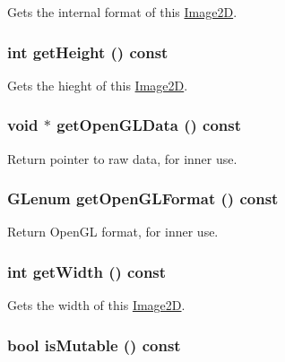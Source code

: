 Gets the internal format of this \hyperlink{classm3g_1_1Image2D}{Image2D}. \hypertarget{classm3g_1_1Image2D_317329daf960a1759801c0f16d43d5a3}{
\subsubsection[{getHeight}]{\setlength{\rightskip}{0pt plus 5cm}int getHeight () const}}
\label{classm3g_1_1Image2D_317329daf960a1759801c0f16d43d5a3}


Gets the hieght of this \hyperlink{classm3g_1_1Image2D}{Image2D}. \hypertarget{classm3g_1_1Image2D_b837b1bdda59947a6d818c448965c502}{
\subsubsection[{getOpenGLData}]{\setlength{\rightskip}{0pt plus 5cm}void $\ast$ getOpenGLData () const}}
\label{classm3g_1_1Image2D_b837b1bdda59947a6d818c448965c502}


Return pointer to raw data, for inner use. \hypertarget{classm3g_1_1Image2D_7923da2fe82fee768ec9937a693e843c}{
\subsubsection[{getOpenGLFormat}]{\setlength{\rightskip}{0pt plus 5cm}GLenum getOpenGLFormat () const}}
\label{classm3g_1_1Image2D_7923da2fe82fee768ec9937a693e843c}


Return OpenGL format, for inner use. \hypertarget{classm3g_1_1Image2D_f149cb053bc8b5fbc1364b5dbb934488}{
\subsubsection[{getWidth}]{\setlength{\rightskip}{0pt plus 5cm}int getWidth () const}}
\label{classm3g_1_1Image2D_f149cb053bc8b5fbc1364b5dbb934488}


Gets the width of this \hyperlink{classm3g_1_1Image2D}{Image2D}. \hypertarget{classm3g_1_1Image2D_d687aabba553d1c66bfc253ec7e5bd05}{
\subsubsection[{isMutable}]{\setlength{\rightskip}{0pt plus 5cm}bool isMutable () const}}
\label{classm3g_1_1Image2D_d687aabba553d1c66bfc253ec7e5bd05}


